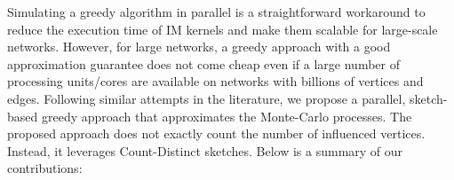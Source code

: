 \documentclass[10pt,journal,compsoc]{IEEEtran}
\begin{document}
 

Simulating a greedy algorithm in parallel is a straightforward workaround to reduce the execution time of IM kernels and make them scalable for large-scale networks. However, for large networks, a greedy approach with a good approximation guarantee does not come cheap even if a large number of processing units/cores are available on networks with billions of vertices and edges. Following similar attempts in the literature, we propose a parallel, sketch-based greedy approach that approximates the Monte-Carlo processes. The proposed approach does not exactly count the number of influenced vertices. Instead, it leverages Count-Distinct sketches. Below is a summary of our contributions:
\end{document}
